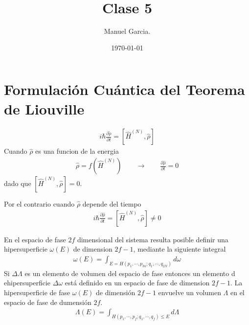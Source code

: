 \documentclass{article}
\title{Clase 5}
\author{Manuel Garcia.}
\date{\today}
\begin{document}
\maketitle

\section{Formulación Cuántica del Teorema de Liouville}
\begin{gather*}
  i \hbar \frac{\partial \tilde \rho }{\partial t } = [\hat H ^ {(N) }, \hat \rho] 
\end{gather*}
Cuando $ \hat \rho $ es una funcion de la energia 
\begin{gather*}
  \hat \rho = f(\hat H ^ {(N )}) \qquad \rightarrow \qquad \frac{\partial \hat \rho }{\partial t } = 0
\end{gather*}
dado que $ [\hat H ^ {(N) }, \hat \rho] = 0 $.

Por el contrario cuando $ \hat \rho  $ depende del tiempo 
\begin{gather*}
  i \hbar  \frac{\partial \hat \rho }{\partial t } = \left[  \hat H ^{(N)} , \hat \rho  \right] \neq 0 
\end{gather*}

\hfill 

\hfill 

\hfill 

\hfill 



En el espacio de fase $ 2f $ dimensional del sistema resulta posible definir una hipersuperficie $ \omega(E) $ de dimension $ 2f-1 $, mediante la siguiente integral 
\begin{gather*}
  \omega(E) = \displaystyle\int_{E = H(p_1,\cdots , p _{3n } ; q_1,\cdots, q _{2N } )}^{} d\omega 
\end{gather*}
Si $ \Delta \Lambda $ es un elemento de volumen del espacio de fase entonces un elemento d ehipersuperficie $ \Delta \omega $ está definido en un espacio de fase de dimension $ 2f-1  $. La hipersuperficie de fase $ \omega(E)  $ de dimensión $ 2f-1  $ envuelve un volumen $ \Lambda $ en el espacio de fase de dumensión $ 2f  $.
\begin{gather*}
  \Lambda(E) = \displaystyle\int_{H(p_1, \cdots, p_f;q_1, \cdots, q_f)\leq E }^{}d\Lambda 
\end{gather*}

\hfill 

\hfill 
\end{document}
